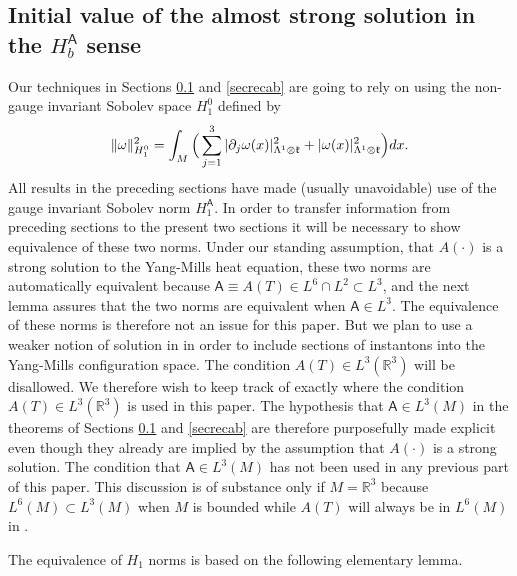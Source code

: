 \documentclass[12pt]{article}
\def \L{\Lambda}
\def \R{\mathbb R}
\def \As{\mathsf{A}}
\def \w{\omega}
\def \kf{\frak k}
\def \p{\partial}
\def \beq{\begin{equation}}
\def \eeq{\end{equation}}
\numberwithin{equation}{section}
\begin{document}
\subsection{Initial value of the almost strong solution in the $H_b^\As$ sense} \label{secivas}
    
     
     Our techniques in Sections  \ref{secivas} and \ref{secrecab} are going to rely on using the 
     non-gauge invariant Sobolev space $H_1^0$ defined by
     \beq
     \|\w\|_{H_1^0}^2 
     = \int_M \Big(\sum_{j=1}^3|\p_j \w(x)|_{\L^1\otimes \kf}^2  +|\w(x)|_{\L^1\otimes \kf}^2\Big)dx.
     \eeq     
     All results in the preceding sections have made (usually unavoidable) use of the gauge 
     invariant Sobolev norm $H_1^\As$.  In order to transfer information from preceding sections
     to the present two sections it will be necessary to show equivalence of these two norms.
     Under our standing assumption, that $A(\cdot)$ is a strong solution to the Yang-Mills heat equation,
     these two norms are automatically equivalent  because $\As \equiv A(T) \in L^6 \cap L^2 \subset L^3 $,
      and the next lemma assures that the two norms are equivalent when $\As \in L^3$.     
     The equivalence of these norms is therefore  not an issue for this paper. 
     But we plan to use a weaker notion of solution in \cite{G72} 
      in order to include sections of instantons into the Yang-Mills configuration space.  
      The condition $A(T) \in L^3(\R^3)$ will be disallowed. We therefore
     wish to keep track of  exactly where the  condition $A(T)  \in L^3(\R^3)$ is used in this paper.
     The hypothesis that $\As  \in L^3(M)$ in the theorems of Sections \ref{secivas} and \ref{secrecab}
     are therefore purposefully made explicit even though they already are implied by
      the assumption that $A(\cdot)$ is a  strong solution.
       The condition that $\As \in L^3(M)$ has not been used in any previous part  of this  paper.
            This discussion is of substance  only if $M = \R^3$  because $L^6(M)\subset L^3(M)$ 
            when $M$ is bounded  while $A(T)$ will always be in $L^6(M)$ in \cite{G72}. 
    
      The equivalence of $H_1$
     norms is based on the following elementary lemma.

     
   
\end{document}
